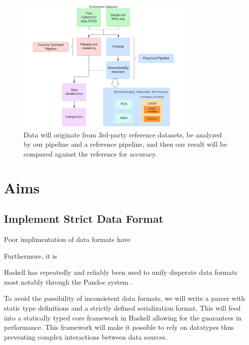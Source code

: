 \documentclass[11pt,letterpaper]{article}
\begin{document}
\begin{figure}[h]
    \centering
    \includegraphics[width=3.4in]{whpc_data_diagram}
    \caption{Data will originate from 3rd-party reference datasets, be analyzed by our pipeline and a reference pipeline, and then our result will be compared against the reference for accuracy.}
    \label{fig:datadiagram}
\end{figure}


\section{Aims}
\subsection{Implement Strict Data Format}


Poor implimentation of data formats have  %



Furthermore, it is 

Haskell has repeatedly and reliably been used to unify disperate data formats most notably through the Pandoc system \cite{krijnen2014expand}.

To avoid the possibility of inconsistent data formats, we will write a parser with static type definitions and a strictly defined serialization format. This will feed into a statically typed core framework in Haskell allowing for the guarantees in performance. This framework will make it possible to rely on datatypes thus preventing complex interactions between data sources.
\end{document}
